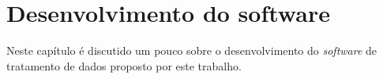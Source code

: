 \chapter{Desenvolvimento do software}
	\label{ch:desenvolvimento}
Neste capítulo é discutido um pouco sobre o desenvolvimento do \textit{software} de tratamento de dados proposto por este trabalho. 